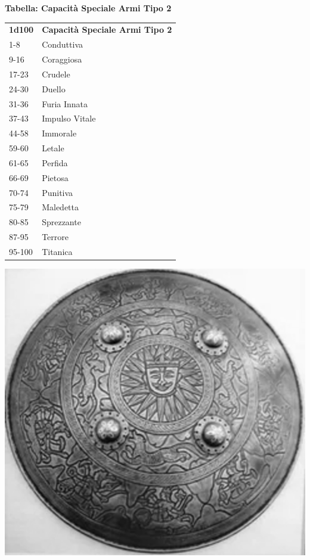\begin{multicols}{2}

	\textbf{Tabella: Capacità Speciale Armi Tipo 2}

	\medskip

	\begin{tabular}{ll}
		\textbf{1d100} & \textbf{Capacità Speciale Armi Tipo 2}\\
		1-8& Conduttiva\\
		9-16&Coraggiosa\\
		17-23&Crudele\\
		24-30&Duello\\
		31-36&Furia Innata\\
		37-43&Impulso Vitale\\
		44-58&Immorale\\
		59-60&Letale\\
		61-65&Perfida\\
		66-69&Pietosa\\
		70-74&Punitiva\\
		75-79&Maledetta\\
		80-85&Sprezzante\\
		87-95&Terrore\\
		95-100 &Titanica\\
	\end{tabular}

	\bigskip

	\begin{center}
		\includegraphics[width=0.7\linewidth]{immagini/shield1.png}
	\end{center}


\end{multicols}
